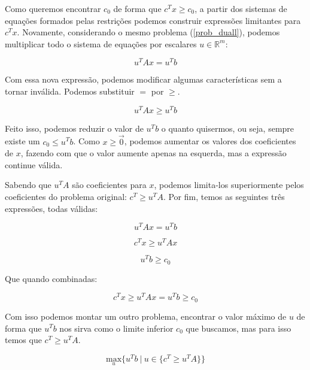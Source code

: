 Como queremos encontrar \(c_0\) de forma que \(c^Tx \geq c_0\), a partir dos sistemas de equações
formados pelas restrições podemos construir expressões limitantes para \(c^Tx\). Novamente,
considerando o mesmo problema (\ref{prob_duall}), podemos multiplicar todo o sistema de
equações por escalares \(u \in \mathbb{R}^m\):

\begin{equation}
u^TAx = u^Tb
\end{equation}

Com essa nova expressão, podemos modificar algumas características sem a tornar inválida.
Podemos substituir \(=\) por \(\geq\).

\begin{equation}
u^TAx \geq u^Tb
\end{equation}

Feito isso, podemos reduzir o valor de \(u^Tb\) o quanto quisermos, ou seja, sempre existe
um \(c_0 \leq u^Tb\). Como \(x \geq \overrightarrow{\mathrm 0}\), podemos aumentar os valores dos
coeficientes de \(x\), fazendo com que o valor aumente apenas na esquerda, mas a expressão
continue válida.

Sabendo que \(u^TA\) são coeficientes para \(x\), podemos limita-los superiormente pelos
coeficientes do problema original: \(c^T \geq u^TA\). Por fim, temos as seguintes três expressões, todas
válidas:

\begin{equation}
  u^TAx = u^Tb
\end{equation}

\begin{equation}
  c^Tx \geq u^TAx
\end{equation}

\begin{equation}
  u^Tb \geq c_0
\end{equation}

Que quando combinadas:

\begin{equation}
c^Tx \geq u^TAx = u^Tb \geq c_0
\end{equation}

Com isso podemos montar um outro problema, encontrar o valor máximo de \(u\) de forma que \(u^Tb\)
nos sirva como o limite inferior \(c_0\) que buscamos, mas para isso temos que \(c^T \geq u^TA \).

\begin{equation}
\underset{u}{\mathrm{max}}\{u^Tb\ |\ u \in \{c^T \geq u^TA \} \}
\end{equation}


